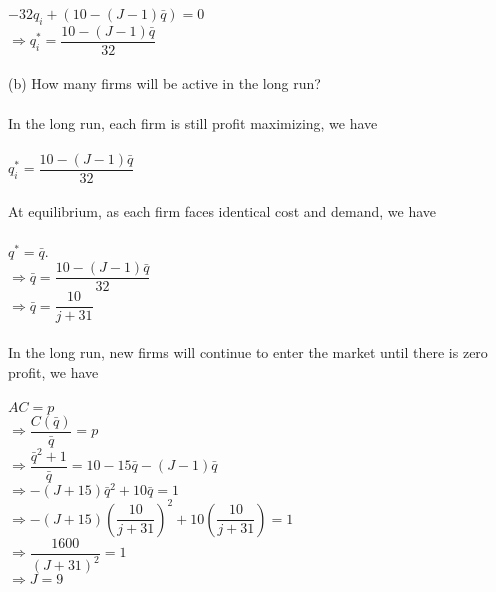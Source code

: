 \documentclass{article}
\begin{document}
\begin{itemize}
    $-32q_i+(10-(J-1)\bar{q})=0$\\
    $\Rightarrow q_i^*=\dfrac{10-(J-1)\bar{q}}{32}$\\\\
    (b) How many firms will be active in the long run?\\\\
    In the long run, each firm is still profit maximizing, we have\\\\
    $q_i^*=\dfrac{10-(J-1)\bar{q}}{32}$\\\\
    At equilibrium, as each firm faces identical cost and demand, we have\\\\
    $q^*=\bar{q}$.\\
    $\Rightarrow \bar{q}=\dfrac{10-(J-1)\bar{q}}{32}$\\
    $\Rightarrow \bar{q}=\dfrac{10}{j+31}$\\\\
    In the long run, new firms will continue to enter the market until there is zero profit, we have\\\\
    $AC=p$\\
    $\Rightarrow\dfrac{C(\bar{q})}{\bar{q}}=p$\\
    $\Rightarrow\dfrac{\bar{q}^2+1}{\bar{q}}=10-15\bar{q}-(J-1)\bar{q}$\\
    $\Rightarrow -(J+15)\bar{q}^2+10\bar{q}=1$\\
    $\Rightarrow -(J+15)(\dfrac{10}{j+31})^2+10(\dfrac{10}{j+31})=1$\\
    $\Rightarrow\dfrac{1600}{(J+31)^2}=1$\\
    $\Rightarrow J=9$
\end{itemize}
\pagebreak
\end{document}
